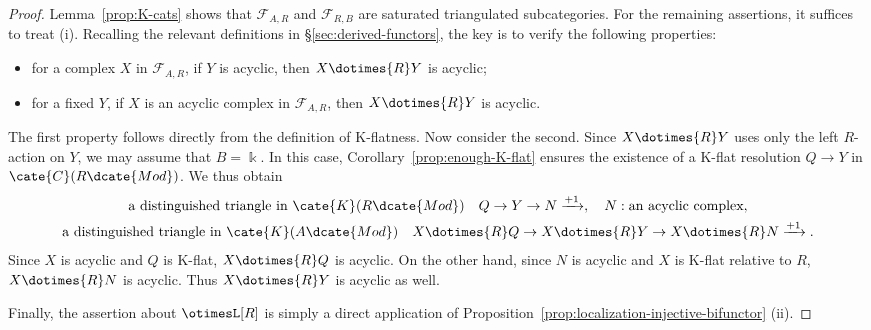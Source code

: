 \begin{proof}
	Lemma~\ref{prop:K-cats} shows that $\mathcal{F}_{A,R}$ and
	$\mathcal{F}_{R,B}$ are saturated triangulated subcategories. For the
	remaining assertions, it suffices to treat (i). Recalling the relevant
	definitions in \S\ref{sec:derived-functors}, the key is to verify the
	following properties:
	\begin{itemize}
		\item for a complex $X$ in $\mathcal{F}_{A,R}$, if $Y$ is acyclic, then
		$X\dotimes{R}Y$ is acyclic;
		\item for a fixed $Y$, if $X$ is an acyclic complex in
		$\mathcal{F}_{A,R}$, then $X\dotimes{R}Y$ is acyclic.
	\end{itemize}

	The first property follows directly from the definition of K-flatness. Now
	consider the second. Since $X\dotimes{R}Y$ uses only the left $R$-action on
	$Y$, we may assume that $B=\Bbbk$. In this case,
	Corollary~\ref{prop:enough-K-flat} ensures the existence of a K-flat
	resolution $Q\to Y$ in $\cate{C}(R\dcate{Mod})$. We thus obtain
	\begin{gather*}
		\text{a distinguished triangle in }\cate{K}(R\dcate{Mod}) \quad Q \to Y \to N \xrightarrow{+1}, \quad N: \text{an acyclic complex}, \\
		\text{a distinguished triangle in }\cate{K}(A\dcate{Mod}) \quad X \dotimes{R} Q \to X \dotimes{R} Y \to X \dotimes{R} N \xrightarrow{+1}.
	\end{gather*}
	Since $X$ is acyclic and $Q$ is K-flat, $X\dotimes{R}Q$ is acyclic. On the
	other hand, since $N$ is acyclic and $X$ is K-flat relative to $R$,
	$X\dotimes{R}N$ is acyclic. Thus $X\dotimes{R}Y$ is acyclic as well.

	Finally, the assertion about $\otimesL[R]$ is simply a direct application of
	Proposition~\ref{prop:localization-injective-bifunctor} (ii).
\end{proof}

